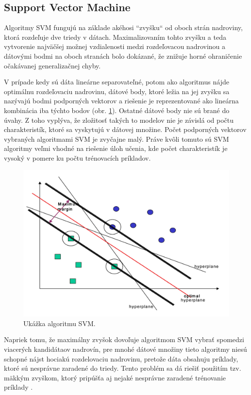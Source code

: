 \subsection{Support Vector Machine}
Algoritmy SVM fungujú na základe akéhosi ``zvyšku`` od oboch strán nadroviny, ktorá rozdeľuje dve triedy v dátach. Maximalizovaním tohto zvyšku a teda vytvorenie najväčšej možnej vzdialenosti medzi rozdeľovacou nadrovinou a dátovými bodmi na oboch stranách bolo dokázané, že znižuje horné ohraničenie očakávanej generalizačnej chyby.\par
V prípade kedy sú dáta lineárne separovateľné, potom ako algoritmus nájde optimálnu rozdeľovaciu nadrovinu, dátové body, ktoré ležia na jej zvyšku sa nazývajú bodmi podporných vektorov a riešenie je reprezentované ako lineárna kombinácia iba týchto bodov (obr. \ref{img:svm}). Ostatné dátové body nie sú brané do úvahy. Z toho vyplýva, že zložitosť takých to modelov nie je závislá od počtu charakteristík, ktoré sa vyskytujú v dátovej množine. Počet podporných vektorov vybraných algoritmami SVM je zvyčajne malý. Práve kvôli tomuto sú SVM algoritmy veľmi vhodné na riešenie úloh učenia, kde počet charakteristík je vysoký v pomere ku počtu trénovacích príkladov.\par
\begin{figure}[H]
	\begin{center}
		\includegraphics[scale=0.3]{img/svm.png}
		\caption{Ukážka algoritmu SVM. \cite{class_review}}
		\label{img:svm}
	\end{center}
\end{figure}
Napriek tomu, že maximálny zvyšok dovoľuje algoritmom SVM vybrať spomedzi viacerých kandidátaov nadrovín, pre mnohé dátové množiny tieto algoritmy niesú schopné nájst hociakú rozdelovaciu nadrovinu, pretože dáta obsahuju  príklady, ktoré sú nesprávne zaradené do triedy. Tento problém sa dá riešiť použitím tzv. mäkkým zvyškom, ktorý pripúšťa aj nejaké nesprávne zaradené trénovanie príklady \cite{veropoulos1999}.\par
